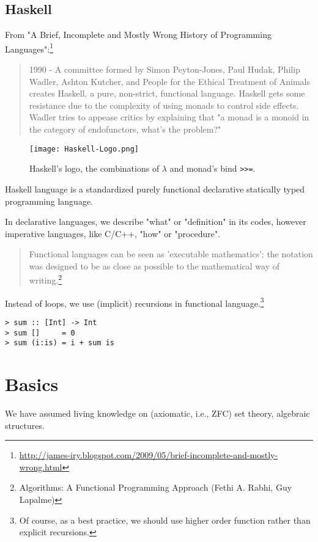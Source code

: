 \documentclass[11pt]{book}
\begin{document}
\section{Haskell}
From "A Brief, Incomplete and Mostly Wrong History of Programming Languages":\footnote{
\url{http://james-iry.blogspot.com/2009/05/brief-incomplete-and-mostly-wrong.html}
}
\begin{quotation}
1990 - A committee formed by Simon Peyton-Jones, Paul Hudak, Philip Wadler, Ashton Kutcher, and People for the Ethical Treatment of Animals creates Haskell, a pure, non-strict, functional language. Haskell gets some resistance due to the complexity of using monads to control side effects. Wadler tries to appease critics by explaining that "a monad is a monoid in the category of endofunctors, what's the problem?" 
\end{quotation}

\begin{figure}[htbp]
\begin{center}
\texttt{[image: Haskell-Logo.png]}
\caption{Haskell's logo, the combinations of $\lambda$ and monad's bind \texttt{>>=}.}
\label{Haskell-Logo}
\end{center}
\end{figure}

Haskell language is a standardized purely functional declarative statically typed programming language.

In declarative languages, we describe "what" or "definition" in its codes, however imperative languages, like C/C++, "how" or "procedure".
\begin{quotation}
Functional languages can be seen as 'executable mathematics'; the notation was designed to be as close as possible to the mathematical way of writing.\footnote{
Algorithms: A Functional Programming Approach (Fethi A. Rabhi, Guy Lapalme)
}
\end{quotation}
Instead of loops, we use (implicit) recursions in functional language.\footnote{Of course, as a best practice, we should use higher order function rather than explicit recursions.
}
\begin{verbatim}
> sum :: [Int] -> Int
> sum []     = 0
> sum (i:is) = i + sum is
\end{verbatim}



\chapter{Basics}
We have assumed living knowledge on (axiomatic, i.e., ZFC) set theory, algebraic structures.
\end{document}
